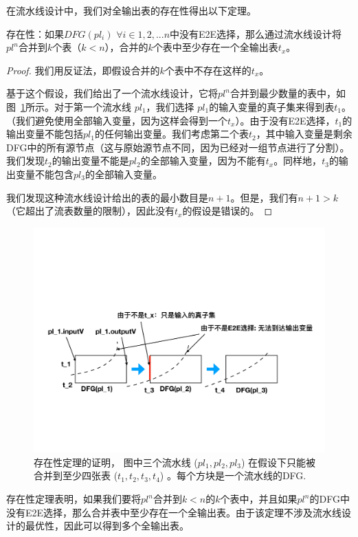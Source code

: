在流水线设计中，我们对全输出表的存在性得出以下定理。

\begin{theorem}
\label{lp-prop1}
存在性：如果$DFG(pl_i)$ $\forall i \in 1, 2, ... n$中没有E2E选择，那么通过流水线设计将$pl^n$合并到$k$个表（$k < n$），合并的$k$个表中至少存在一个全输出表$t_x$。
\end{theorem}

\begin{proof}
我们用反证法，即假设合并的$k$个表中不存在这样的$t_x$。

基于这个假设，我们给出了一个流水线设计，它将$pl^n$合并到最少数量的表中，如图~\ref{fig:proof}所示。对于第一个流水线 $pl_1$，我们选择 $pl_1$的输入变量的真子集来得到表$t_1$。（我们避免使用全部输入变量，因为这样会得到一个$t_x$）。由于没有E2E选择，$t_1$的输出变量不能包括$pl_1$的任何输出变量。我们考虑第二个表$t_2$，其中输入变量是剩余DFG中的所有源节点（这与原始源节点不同，因为已经对一组节点进行了分割）。我们发现$t_2$的输出变量不能是$pl_2$的全部输入变量，因为不能有$t_x$。同样地，$t_3$的输出变量不能包含$pl_3$的全部输入变量。

我们发现这种流水线设计给出的表的最小数目是$n+1$。但是，我们有$n + 1 > k$（它超出了流表数量的限制），因此没有$t_x$的假设是错误的。
\end{proof}


\begin{figure}[!htbp]
\includegraphics[width=0.8\linewidth]{figures/lp-69.pdf}
\centering
\caption{\small 存在性定理的证明， 图中三个流水线 ($pl_1, pl_2, pl_3$) 在假设下只能被合并到至少四张表 ($t_1, t_2, t_3, t_4$) 。每个方块是一个流水线的DFG.}
\label{fig:proof}
\end{figure}

存在性定理表明，如果我们要将$pl^n$合并到$k < n$的$k$个表中，并且如果$pl^n$的DFG中没有E2E选择，那么合并表中至少存在一个全输出表。由于该定理不涉及流水线设计的最优性，因此可以得到多个全输出表。

